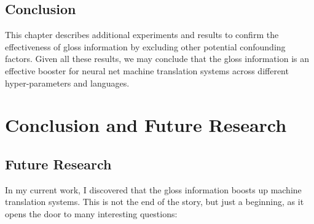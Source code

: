 \documentclass[final]{ua-thesis}
\numberwithin{equation}{section}
\begin{document}
\section{Conclusion}

This chapter describes additional experiments and results to confirm the effectiveness of gloss information by excluding other potential confounding factors.
Given all these results, we may conclude that the gloss information is an effective booster for neural net machine translation systems across different hyper-parameters and languages.       
\chapter{Conclusion and Future Research}

\section{Future Research}

In my current work, I discovered that the gloss information boosts up machine translation systems. This is not the end of the story, but just a beginning, as it opens the door to many interesting questions:
\end{document}
